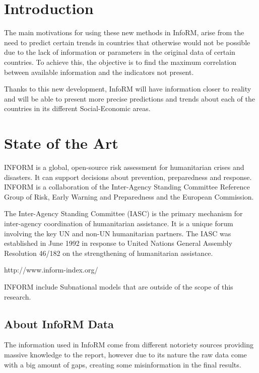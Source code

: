 \documentclass[a4project, twocolumn]{article}
\begin{document}
\justify
\onecolumn
\Large{
\tableofcontents}

\normalsize
\vfill
\pagebreak
\twocolumn

\section{Introduction}

The main motivations for using these new methods in InfoRM, arise from the need to predict certain trends in countries that otherwise would not be possible due to the lack of information or parameters in the original data of certain countries. To achieve this, the objective is to find the maximum correlation between available information and the indicators not present.

Thanks to this new development, InfoRM will have information closer to reality and will be able to present more precise predictions and trends about each of the countries in its different Social-Economic areas.


\section{State of the Art}
INFORM is a global, open-source risk assessment for humanitarian crises and disasters. It can support decisions about prevention, preparedness and response. INFORM is a collaboration of the Inter-Agency Standing Committee Reference Group of Risk, Early Warning and Preparedness and the European Commission.

The Inter-Agency Standing Committee (IASC) is the primary mechanism for inter-agency coordination of humanitarian assistance. It is a unique forum involving the key UN and non-UN humanitarian partners. The IASC was established in June 1992 in response to United Nations General Assembly Resolution 46/182 on the strengthening of humanitarian assistance.

http://www.inform-index.org/

INFORM include Subnational models that are outside of the scope of this research.

\subsection{About InfoRM Data}

The information used in InfoRM come from different notoriety sources providing massive knowledge to the report, however due to its nature the raw data come with a big amount of gaps, creating some misinformation in the final results.
\end{document}
